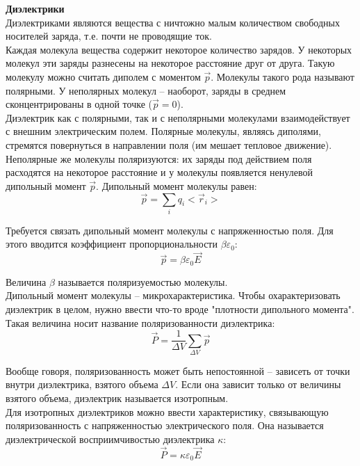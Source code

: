 \documentclass{article}
\begin{document}
	
	\textbf{Диэлектрики}\\

	Диэлектриками являются вещества с ничтожно малым количеством свободных носителей заряда, т.е. почти не проводящие ток. \\

	Каждая молекула вещества содержит некоторое количество зарядов. У некоторых молекул эти заряды разнесены на некоторое расстояние друг от друга. Такую молекулу можно считать диполем с моментом $\vec p$. Молекулы такого рода называют полярными. У неполярных молекул -- наоборот, заряды в среднем сконцентрированы в одной точке ($\vec p = 0$).\\

	Диэлектрик как с полярными, так и с неполярными молекулами взаимодействует с внешним электрическим полем. Полярные молекулы, являясь диполями, стремятся повернуться в направлении поля (им мешает тепловое движение). Неполярные же молекулы поляризуются: их заряды под действием поля расходятся на некоторое расстояние и у молекулы появляется ненулевой дипольный момент $\vec p$. Дипольный момент молекулы равен:
	\begin{equation}
		\vec p = \sum_i q_i<\vec r_i>
	\end{equation}

	Требуется связать дипольный момент молекулы с напряженностью поля. Для этого вводится коэффициент пропорциональности $\beta\varepsilon_0$:
	\begin{equation}
		\vec p = \beta\varepsilon_0\vec E
	\end{equation}

	Величина $\beta$ называется поляризуемостью молекулы.\\

	Дипольный момент молекулы -- микрохарактеристика. Чтобы охарактеризовать диэлектрик в целом, нужно ввести что-то вроде "плотности дипольного момента". Такая величина носит название поляризованности диэлектрика:
	\begin{equation}
		\vec P = \frac{1}{\Delta V}\sum_{\Delta V}\vec p
	\end{equation}

	Вообще говоря, поляризованность может быть непостоянной -- зависеть от точки внутри диэлектрика, взятого объема $\Delta V$. Если она зависит только от величины взятого объема, диэлектрик называется изотропным.\\

	Для изотропных диэлектриков можно ввести характеристику, связывающую поляризованность с напряженностью электрического поля. Она называется диэлектрической восприимчивостью диэлектрика $\kappa$:
	\begin{equation}
		\vec P = \kappa\varepsilon_0\vec E
	\end{equation}
\end{document}
